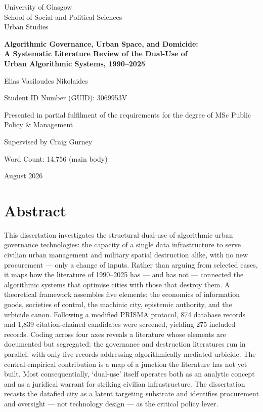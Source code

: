 \documentclass[12pt,a4paper,twoside]{report}
\newcommand{\thesisitle}{Algorithmic Governance, Urban Space, and Domicide: \\
  A Systematic Literature Review of the Dual-Use of \\
  Urban Algorithmic Systems, 1990–2025}
\newcommand{\authorname}{Elias Vasiloudes Nikolaides}
\newcommand{\supervisorname}{Craig Gurney}
\newcommand{\programme}{MSc Public Policy \& Management}
\newcommand{\university}{University of Glasgow}
\newcommand{\submissiondate}{August 2026}
\begin{document}

\begin{titlepage}
  \centering
  {\large \university\\
  School of Social and Political Sciences\\
  Urban Studies \par}
  \vspace{2.5cm}
  {\LARGE\bfseries \thesisitle \par}
  \vspace{1.5cm}
  {\Large \authorname \par}
  \vspace{0.5cm}
  {\large Student ID Number (GUID): 3069953V \par}
  \vspace{1.5cm}
  {\large Presented in partial fulfilment of the requirements for the degree of \programme \par}
  \vspace{1cm}
  {\large Supervised by \supervisorname \par}
  \vspace{1cm}
  {\large Word Count: 14,756 (main body) \par}
  \vspace{0.5cm}
  {\large \submissiondate \par}
  \vfill
\end{titlepage}

\chapter*{Abstract}

This dissertation investigates the structural dual-use of algorithmic urban governance technologies: the capacity of a single data infrastructure to serve civilian urban management and military spatial destruction alike, with no new procurement — only a change of inputs. Rather than arguing from selected cases, it maps how the literature of 1990–2025 has — and has not — connected the algorithmic systems that optimise cities with those that destroy them. A theoretical framework assembles five elements: the economics of information goods, societies of control, the machinic city, epistemic authority, and the urbicide canon. Following a modified PRISMA protocol, 874 database records and 1,839 citation-chained candidates were screened, yielding 275 included records. Coding across four axes reveals a literature whose elements are documented but segregated: the governance and destruction literatures run in parallel, with only five records addressing algorithmically mediated urbicide. The central empirical contribution is a map of a junction the literature has not yet built. Most consequentially, `dual-use' itself operates both as an analytic concept and as a juridical warrant for striking civilian infrastructure. The dissertation recasts the datafied city as a latent targeting substrate and identifies procurement and oversight — not technology design — as the critical policy lever.
\end{document}
